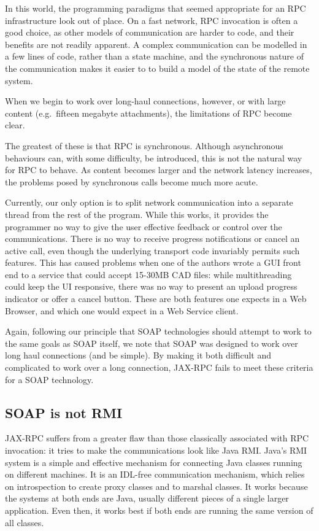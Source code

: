 In this world, the programming paradigms that seemed appropriate for
an RPC infrastructure look out of place. On a fast network, RPC
invocation is often a good choice, as other models of communication
are harder to code, and their benefits are not readily apparent. A complex
communication can be modelled in a few lines of code, rather than a state
machine, and the synchronous nature of the communication makes it easier to
to build a model of the state of the remote system.  

When we begin to work over long-haul connections, however, or with large
content (e.g.\ fifteen megabyte attachments), the limitations of RPC
become clear.

The greatest of these is that RPC is synchronous. Although
asynchronous behaviours can, with some difficulty, be introduced, this
is not the natural way for RPC to behave. As content becomes larger
and the network latency increases, the problems posed by synchronous
calls become much more acute. 

Currently, our only option is to split network communication into a
separate thread from the rest of the program. While this works, it
provides the programmer no way to give the user effective feedback or
control over the communications. There is no way to receive progress
notifications or cancel an active call, even though the underlying
transport code invariably permits such features. This has caused problems when
one of the authors wrote a GUI front end to a service that could accept 15-30MB
CAD files: while multithreading could keep the UI responsive, there was no way
to present an upload progress indicator or offer a cancel button. These are both
features one expects in a Web Browser, and which one would expect in a Web
Service client.

Again, following our principle that SOAP technologies should
attempt to work to the same goals as SOAP itself, we note that SOAP
was designed to work over long haul connections (and be simple). By
making it both difficult and complicated to work over a long
connection, JAX-RPC fails to meet these criteria for a SOAP
technology.

\subsection{SOAP is not RMI}
\label{objections:soap-not-rmi}

JAX-RPC suffers from a greater flaw than those classically associated
with RPC invocation: it tries to make the communications look like
Java RMI. Java's RMI system is a simple and effective mechanism for
connecting Java classes running on different machines. It is an
IDL-free communication mechanism, which relies on introspection to
create proxy classes and to marshal classes. It works because the
systems at both ends are Java, usually different pieces of a single
larger application. Even then, it works best if both ends are running
the same version of all classes.

